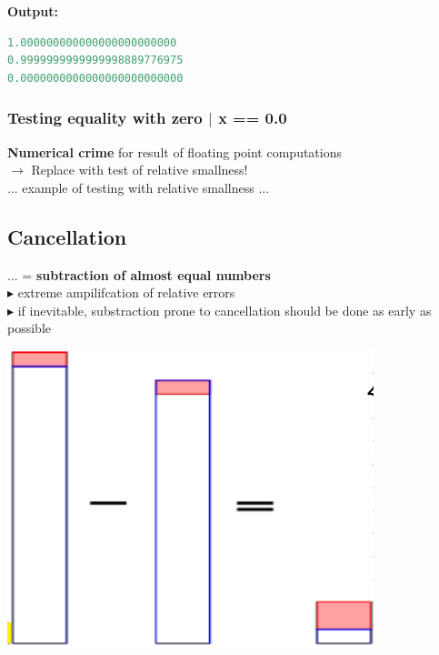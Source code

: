 \documentclass[12pt, a4paper]{article}
\begin{document}
\textbf{Output:} 

\begin{lstlisting}[language=c++]
1.000000000000000000000000
0.9999999999999998889776975
0.0000000000000000000000000
\end{lstlisting}


\hspace{5mm}	
\subsubsection{Testing equality with zero $|$ x == 0.0} 
\textbf{Numerical crime} for result of floating point computations \\
$\rightarrow$ Replace with test of relative smallness! \\
	
	... example of testing with relative smallness ...
	
\hspace{6mm}

	
\subsection{Cancellation}
 

 \begin{minipage}{0.6\textwidth}
 	... = \textbf{subtraction of almost equal numbers} \\
 $\blacktriangleright$ extreme ampilifcation of relative errors \\
 $\blacktriangleright$ if inevitable, substraction prone to cancellation should be done as early as possible
 \end{minipage}
\hfill
 \begin{minipage}{0.3\textwidth}\raggedleft
 		 \includegraphics[width=0.8\textwidth]{cancellation_illustration.png}
 \end{minipage}
\end{document}
